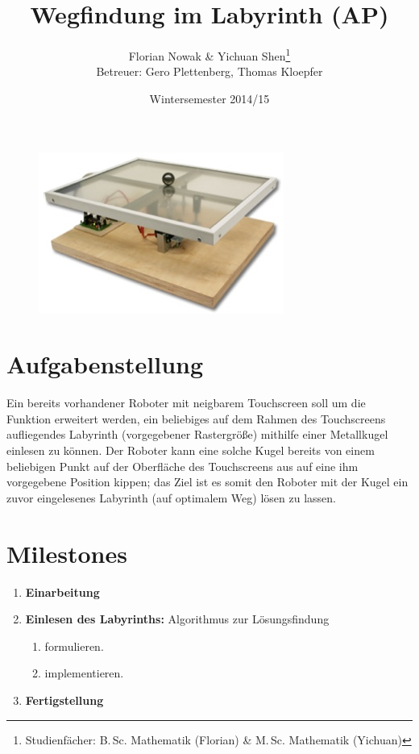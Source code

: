 \documentclass[ngerman]{scrartcl}
\title{Wegfindung im Labyrinth (AP)}
\author{
    Florian Nowak \& Yichuan Shen\footnote{Studienf\"acher: B.\,Sc. Mathematik (Florian) \&  M.\,Sc. Mathematik (Yichuan)}\\
    Betreuer: Gero Plettenberg, Thomas Kloepfer
}
\date{Wintersemester 2014/15}
\begin{document}

\maketitle

\begin{figure}[h]
    \centering
    \includegraphics[scale=.5]{platzhalter}
\end{figure}

\section*{Aufgabenstellung}

Ein bereits vorhandener Roboter mit neigbarem Touchscreen soll um die Funktion erweitert werden, ein beliebiges auf dem Rahmen des Touchscreens aufliegendes Labyrinth (vorgegebener Rastergröße) mithilfe einer Metallkugel einlesen zu können. Der Roboter kann eine solche Kugel bereits von einem beliebigen Punkt auf der Oberfläche des Touchscreens aus auf eine ihm vorgegebene Position kippen; das Ziel ist es somit den Roboter mit der Kugel ein zuvor eingelesenes Labyrinth (auf optimalem Weg) lösen zu lassen.

\section*{Milestones}
\begin{enumerate}
    \item[\textbf{1.}] \textbf{Einarbeitung}
    \item[\textbf{2.}] \textbf{Einlesen des Labyrinths:} Algorithmus zur Lösungsfindung
        \begin{enumerate}
        \item[\textbf{a)}] formulieren.
        \item[\textbf{b)}] implementieren.
        \end{enumerate}
    \item[\textbf{3.}] \textbf{Fertigstellung}
\end{enumerate}
\end{document}
